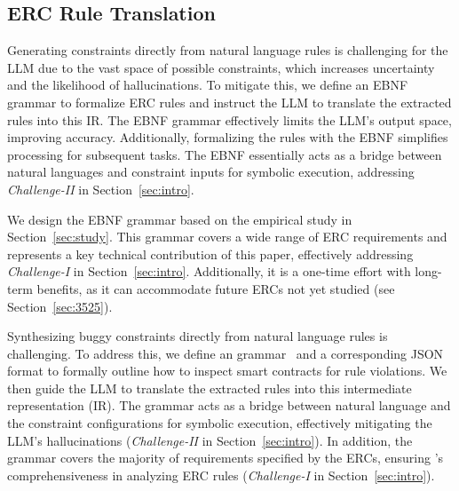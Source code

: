 \subsection{ERC Rule Translation}
\label{sec:translation}
Generating constraints directly from natural language rules is challenging 
for the LLM due to the vast space of possible constraints, 
which increases uncertainty and the likelihood of hallucinations. 
To mitigate this, we define an EBNF grammar to formalize ERC rules 
and instruct the LLM to translate the extracted rules into this IR. 
The EBNF grammar effectively limits the LLM's output space, improving accuracy. 
Additionally, formalizing the rules with the EBNF simplifies processing for subsequent tasks. The EBNF essentially acts as a bridge between natural languages 
and constraint inputs for symbolic execution, addressing \textit{Challenge-II} 
in Section~\ref{sec:intro}.

We design the EBNF grammar based on the empirical study 
in Section~\ref{sec:study}. This grammar covers a wide range of ERC 
requirements and represents a key technical contribution of this paper, 
effectively addressing \textit{Challenge-I} in Section~\ref{sec:intro}. 
Additionally, it is a one-time effort with long-term benefits, 
as it can accommodate future ERCs not yet studied (see Section~\ref{sec:3525}).



Synthesizing buggy constraints directly from natural language rules is challenging. 
To address this, we define an  grammar~\cite{ebnf} and a corresponding JSON format to formally outline 
how to inspect smart contracts for rule violations. 
We then guide the LLM to translate the extracted rules into this intermediate representation (IR). 
The grammar acts as a bridge between natural language and the constraint configurations for symbolic execution, effectively mitigating the LLM’s hallucinations (\emph{Challenge-II} in Section~\ref{sec:intro}). In addition, 
the grammar covers the majority of requirements specified by the ERCs, ensuring \Tool{}’s comprehensiveness in analyzing ERC rules 
(\emph{Challenge-I} in Section~\ref{sec:intro}).

\fi


